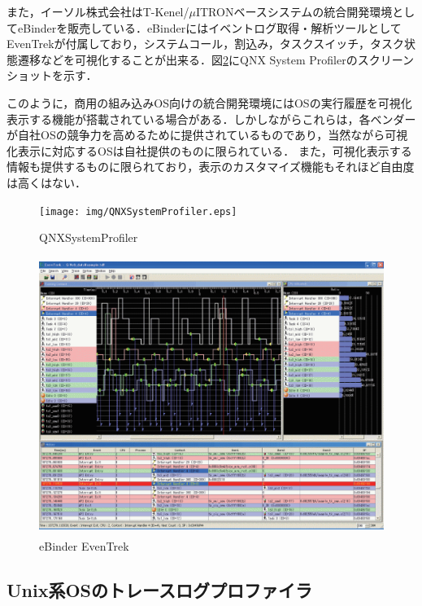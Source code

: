 また，イーソル株式会社はT-Kenel/$\mu$ITRONベースシステムの統合開発環境としてeBinder\cite{eBinder}を販売している．eBinderにはイベントログ取得・解析ツールとしてEvenTrekが付属しており，システムコール，割込み，タスクスイッチ，タスク状態遷移などを可視化することが出来る．図\ref{fig:EvenTrek}にQNX System Profilerのスクリーンショットを示す．

このように，商用の組み込みOS向けの統合開発環境にはOSの実行履歴を可視化表示する機能が搭載されている場合がある．しかしながらこれらは，各ベンダーが自社OSの競争力を高めるために提供されているものであり，当然ながら可視化表示に対応するOSは自社提供のものに限られている．
また，可視化表示する情報も提供するものに限られており，表示のカスタマイズ機能もそれほど自由度は高くはない．

\begin{figure}[p]
\begin{center}
\texttt{[image: img/QNXSystemProfiler.eps]}
\caption{QNXSystemProfiler}
\label{fig:QNXSystemProfiler}
\end{center}
\end{figure}

\begin{figure}[p]
\begin{center}
\includegraphics[height=9cm]{img/EvenTrek.eps}
\caption{eBinder EvenTrek}
\label{fig:EvenTrek}
\end{center}
\end{figure}

\subsection{Unix系OSのトレースログプロファイラ}

